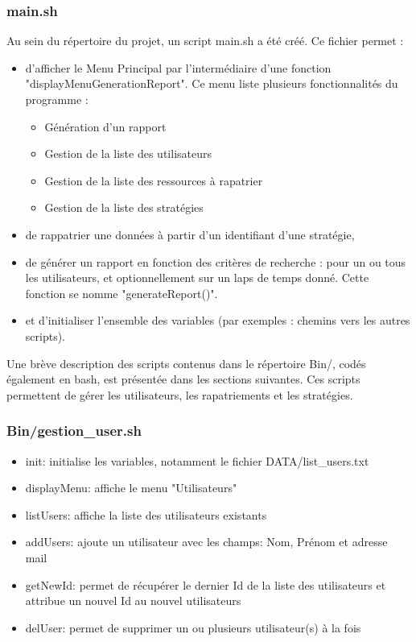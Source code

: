 \documentclass[a4paper,11pt]{article}
\begin{document}
		\subsubsection{main.sh}
			Au sein du répertoire du projet, un script main.sh a été créé.
			Ce fichier permet :
			\begin{itemize}
				\item d'afficher le Menu Principal par l'intermédiaire d'une fonction "displayMenuGenerationReport". Ce menu liste plusieurs fonctionnalités du programme :
				\begin{itemize}
					\item Génération d'un rapport
					\item Gestion de la liste des utilisateurs
					\item Gestion de la liste des ressources à rapatrier
					\item Gestion de la liste des stratégies
				\end{itemize}
				\item de rappatrier une données à partir d'un identifiant d'une stratégie, 
				\item de générer un rapport en fonction des critères de recherche : pour un ou tous les utilisateurs, et optionnellement sur un laps de temps donné. Cette fonction se nomme "generateReport()".
				\item et d'initialiser l'ensemble des variables (par exemples : chemins vers les autres scripts).
			\end{itemize}
		Une brève description des scripts contenus dans le répertoire Bin/, codés également en bash, est présentée dans les sections suivantes. 
		Ces scripts permettent de gérer les utilisateurs, les rapatriements et les stratégies.

		\subsubsection{Bin/gestion\_user.sh}
			\begin{itemize}
				\item init: initialise les variables, notamment le fichier DATA/list\_users.txt
				\item displayMenu: affiche le menu "Utilisateurs"
				\item listUsers: affiche la liste des utilisateurs existants
				\item addUsers: ajoute un utilisateur avec les champs: Nom, Prénom et adresse mail
				\item getNewId: permet de récupérer le dernier Id de la liste des utilisateurs et attribue un nouvel Id au nouvel utilisateurs
				\item delUser: permet de supprimer un ou plusieurs utilisateur(s) à la fois
			\end{itemize}
	
\end{document}
